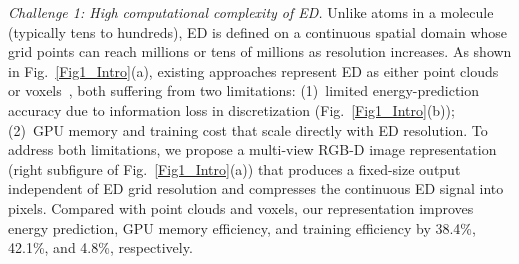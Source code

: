\textit{Challenge 1: High computational complexity of ED.} Unlike atoms in a molecule (typically tens to hundreds), ED is defined on a continuous spatial domain whose grid points can reach millions or tens of millions as resolution increases. As shown in Fig.~\ref{Fig1_Intro}(a), existing approaches represent ED as either point clouds~\cite{guo2020deep} or voxels~\cite{gong2023incorporation}, both suffering from two limitations: (1)~limited energy-prediction accuracy due to information loss in discretization (Fig.~\ref{Fig1_Intro}(b)); (2)~GPU memory and training cost that scale directly with ED resolution. To address both limitations, we propose a multi-view RGB-D image representation (right subfigure of Fig.~\ref{Fig1_Intro}(a)) that produces a fixed-size output independent of ED grid resolution and compresses the continuous ED signal into pixels. Compared with point clouds and voxels, our representation improves energy prediction, GPU memory efficiency, and training efficiency by 38.4\%, 42.1\%, and 4.8\%, respectively.

